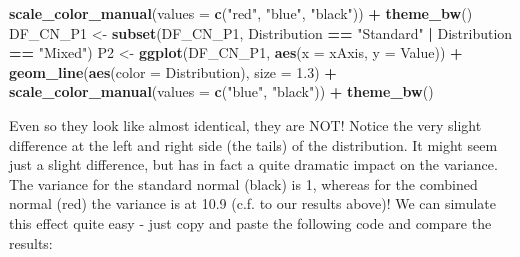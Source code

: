 \documentclass[
]{article}
\newenvironment{Shaded}{\begin{snugshade}}{\end{snugshade}}
\newcommand{\AttributeTok}[1]{\textcolor[rgb]{0.13,0.29,0.53}{#1}}
\newcommand{\FloatTok}[1]{\textcolor[rgb]{0.00,0.00,0.81}{#1}}
\newcommand{\FunctionTok}[1]{\textcolor[rgb]{0.13,0.29,0.53}{\textbf{#1}}}
\newcommand{\NormalTok}[1]{#1}
\newcommand{\OtherTok}[1]{\textcolor[rgb]{0.56,0.35,0.01}{#1}}
\newcommand{\SpecialCharTok}[1]{\textcolor[rgb]{0.81,0.36,0.00}{\textbf{#1}}}
\newcommand{\StringTok}[1]{\textcolor[rgb]{0.31,0.60,0.02}{#1}}
\begin{document}
\begin{Shaded}
\begin{Highlighting}[]
        \FunctionTok{scale\_color\_manual}\NormalTok{(}\AttributeTok{values =} \FunctionTok{c}\NormalTok{(}\StringTok{"red"}\NormalTok{, }\StringTok{"blue"}\NormalTok{, }\StringTok{"black"}\NormalTok{)) }\SpecialCharTok{+}
        \FunctionTok{theme\_bw}\NormalTok{()}
\NormalTok{  DF\_CN\_P1 }\OtherTok{\textless{}{-}} \FunctionTok{subset}\NormalTok{(DF\_CN\_P1, Distribution }\SpecialCharTok{==} \StringTok{"Standard"} \SpecialCharTok{|}\NormalTok{ Distribution }\SpecialCharTok{==} \StringTok{"Mixed"}\NormalTok{)}
\NormalTok{  P2 }\OtherTok{\textless{}{-}} \FunctionTok{ggplot}\NormalTok{(DF\_CN\_P1, }\FunctionTok{aes}\NormalTok{(}\AttributeTok{x =}\NormalTok{ xAxis, }\AttributeTok{y =}\NormalTok{ Value)) }\SpecialCharTok{+}
    \FunctionTok{geom\_line}\NormalTok{(}\FunctionTok{aes}\NormalTok{(}\AttributeTok{color =}\NormalTok{ Distribution), }\AttributeTok{size =} \FloatTok{1.3}\NormalTok{) }\SpecialCharTok{+}
    \FunctionTok{scale\_color\_manual}\NormalTok{(}\AttributeTok{values =} \FunctionTok{c}\NormalTok{(}\StringTok{"blue"}\NormalTok{, }\StringTok{"black"}\NormalTok{)) }\SpecialCharTok{+}
    \FunctionTok{theme\_bw}\NormalTok{()}
\end{Highlighting}
\end{Shaded}

Even so they look like almost identical, they are NOT! Notice the very slight difference at the left and right side (the tails) of the distribution. It might seem just a slight difference, but has in fact a quite dramatic impact on the variance. The variance for the standard normal (black) is 1, whereas for the combined normal (red) the variance is at 10.9 (c.f. to our results above)! We can simulate this effect quite easy - just copy and paste the following code and compare the results:
\end{document}
